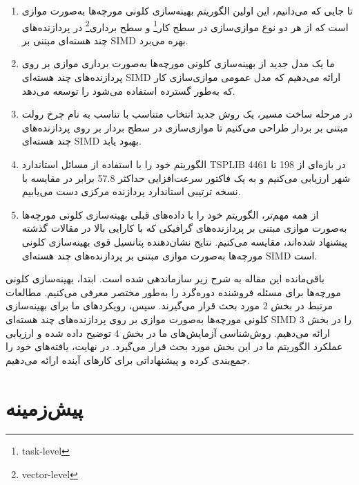 \documentclass[a4paper,10pt]{article}
\begin{document}
        \begin{enumerate}

            \item تا جایی که می‌دانیم، این اولین الگوریتم بهینه‌سازی کلونی مورچه‌ها به‌صورت موازی است که از هر دو نوع موازی‌سازی در سطح کار\footnote{\hspace{2pt}task-level} و سطح برداری\footnote{\hspace{2pt}vector-level} در پردازنده‌های چند هسته‌ای مبتنی بر SIMD بهره می‌برد.

            \item ما یک مدل جدید از بهینه‌سازی کلونی مورچه‌ها به‌صورت برداری موازی بر روی پردازنده‌های چند هسته‌ای SIMD ارائه می‌دهیم که مدل عمومی موازی‌سازی کار که به‌طور گسترده استفاده می‌شود را توسعه می‌دهد.

            \item در مرحله ساخت مسیر، یک روش جدید انتخاب متناسب با تناسب به نام چرخ رولت مبتنی بر بردار طراحی می‌کنیم تا موازی‌سازی در سطح بردار بر روی پردازنده‌های چند هسته‌ای SIMD بهبود یابد.

            \item الگوریتم خود را با استفاده از مسائل استاندارد TSPLIB در بازه‌ای از 198 تا 4461 شهر ارزیابی می‌کنیم و به یک فاکتور سرعت‌افزایی حداکثر 57.8 برابر در مقایسه با نسخه ترتیبی استاندارد پردازنده مرکزی دست می‌یابیم.

            \item از همه مهم‌تر، الگوریتم خود را با داده‌های قبلی بهینه‌سازی کلونی مورچه‌ها به‌صورت موازی مبتنی بر پردازنده‌های گرافیکی که با کارایی بالا در مقالات گذشته پیشنهاد شده‌اند، مقایسه می‌کنیم. نتایج نشان‌دهنده پتانسیل قوی بهینه‌سازی کلونی مورچه‌ها به‌صورت موازی مبتنی بر پردازنده‌های چند هسته‌ای SIMD است.

        \end{enumerate}

        باقی‌مانده این مقاله به شرح زیر سازماندهی شده است. ابتدا، بهینه‌سازی کلونی مورچه‌ها برای مسئله فروشنده دوره‌گرد را به‌طور مختصر معرفی می‌کنیم. مطالعات مرتبط در بخش 2 مورد بحث قرار می‌گیرند. سپس، رویکردهای ما برای بهینه‌سازی کلونی مورچه‌ها به‌صورت موازی بر روی پردازنده‌های چند هسته‌ای SIMD را در بخش 3 ارائه می‌دهیم. روش‌شناسی آزمایش‌های ما در بخش 4 توضیح داده شده و ارزیابی عملکرد الگوریتم ما در این بخش مورد بحث قرار می‌گیرد. در نهایت، یافته‌های خود را جمع‌بندی کرده و پیشنهاداتی برای کارهای آینده ارائه می‌دهیم.

    \section{پیش‌زمینه}
\end{document}
